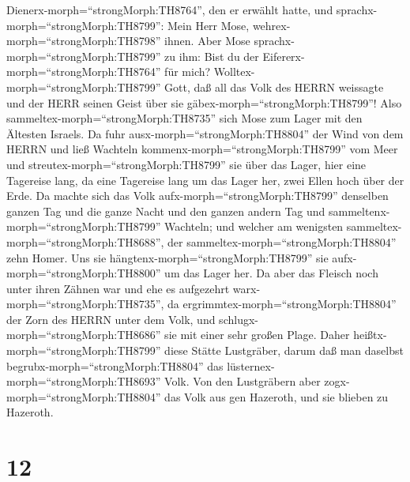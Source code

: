 Dienerx-morph=``strongMorph:TH8764'', den er erwählt hatte, und
sprachx-morph=``strongMorph:TH8799'': Mein Herr Mose,
wehrex-morph=``strongMorph:TH8798'' ihnen.  Aber Mose
sprachx-morph=``strongMorph:TH8799'' zu ihm: Bist du der
Eifererx-morph=``strongMorph:TH8764'' für mich?
Wolltex-morph=``strongMorph:TH8799'' Gott, daß all das Volk des HERRN
weissagte und der HERR seinen Geist über sie
gäbex-morph=``strongMorph:TH8799''!  Also
sammeltex-morph=``strongMorph:TH8735'' sich Mose zum Lager mit den
Ältesten Israels.  Da fuhr
ausx-morph=``strongMorph:TH8804'' der Wind von dem HERRN und ließ
Wachteln kommenx-morph=``strongMorph:TH8799'' vom Meer und
streutex-morph=``strongMorph:TH8799'' sie über das Lager, hier eine
Tagereise lang, da eine Tagereise lang um das Lager her, zwei Ellen hoch
über der Erde.  Da machte sich das Volk
aufx-morph=``strongMorph:TH8799'' denselben ganzen Tag und die ganze
Nacht und den ganzen andern Tag und
sammeltenx-morph=``strongMorph:TH8799'' Wachteln; und welcher am
wenigsten sammeltex-morph=``strongMorph:TH8688'', der
sammeltex-morph=``strongMorph:TH8804'' zehn Homer. Uns sie
hängtenx-morph=``strongMorph:TH8799'' sie
aufx-morph=``strongMorph:TH8800'' um das Lager her.  Da
aber das Fleisch noch unter ihren Zähnen war und ehe es aufgezehrt
warx-morph=``strongMorph:TH8735'', da
ergrimmtex-morph=``strongMorph:TH8804'' der Zorn des HERRN unter dem
Volk, und schlugx-morph=``strongMorph:TH8686'' sie mit einer sehr großen
Plage.  Daher heißtx-morph=``strongMorph:TH8799'' diese
Stätte Lustgräber, darum daß man daselbst
begrubx-morph=``strongMorph:TH8804'' das
lüsternex-morph=``strongMorph:TH8693'' Volk.  Von den
Lustgräbern aber zogx-morph=``strongMorph:TH8804'' das Volk aus gen
Hazeroth, und sie blieben zu Hazeroth.

\hypertarget{section-11}{%
\section{12}\label{section-11}}

